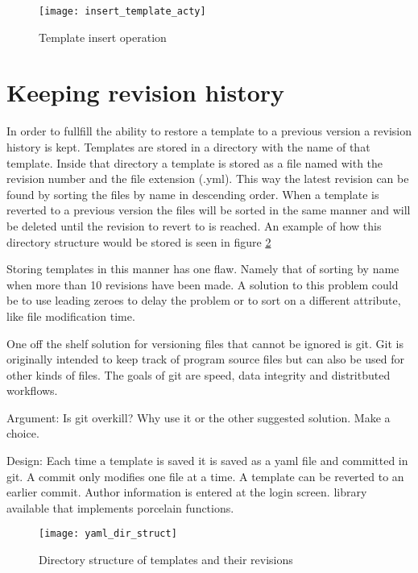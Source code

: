 \begin{figure}[h!]
	\centering
	\texttt{[image: insert\_template\_acty]}
	\caption{Template insert operation}
	\label{fig:inserttemplate}
\end{figure}

\section{Keeping revision history}
In order to fullfill the ability to restore a template to a previous version a revision history is kept.
Templates are stored in a directory with the name of that template.
Inside that directory a template is stored as a file named with the revision number and the file extension (.yml).
This way the latest revision can be found by sorting the files by name in descending order.
When a template is reverted to a previous version the files will be sorted in the same manner and will be deleted until the revision to revert to is reached. An example of how this directory structure would be stored is seen in figure \ref{fig:diskstruct}

Storing templates in this manner has one flaw.
Namely that of sorting by name when more than 10 revisions have been made.
A solution to this problem could be to use leading zeroes to delay the problem or to sort on a different attribute, like file modification time.

One off the shelf solution for versioning files that cannot be ignored is git.
Git is originally intended to keep track of program source files but can also be used for other kinds of files.
The goals of git are speed, data integrity and distritbuted workflows.

Argument: Is git overkill? Why use it or the other suggested solution. Make a choice.

Design:
Each time a template is saved it is saved as a yaml file and committed in git.
A commit only modifies one file at a time.
A template can be reverted to an earlier commit.
Author information is entered at the login screen.
library available that implements porcelain functions.

\begin{figure}[h!]
	\centering
	\texttt{[image: yaml\_dir\_struct]}
	\caption{Directory structure of templates and their revisions}
	\label{fig:diskstruct}
\end{figure}

